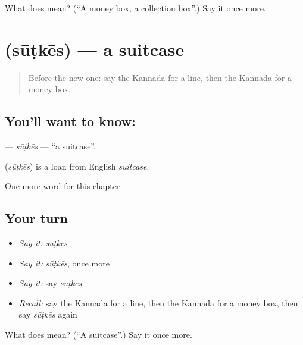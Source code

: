 \begin{tcolorbox}[breakable,colback=teal!4,colframe=teal!35!black,title={Before you move on}]
What does  mean? (\textquotedblleft{}A money box, a collection box\textquotedblright{}.) Say it once more.
\end{tcolorbox}
\section[\texorpdfstring{\kn{ಸೂಟ್ಕೇಸ್} (sūṭkēs)}{ಸೂಟ್ಕೇಸ್ (sūṭkēs)}]{ (sūṭkēs) — a suitcase}

\label{lesson:KA-C230-sutkes}



\begin{quote}
Before the new one: say the Kannada for a line, then the Kannada for a money box.
\end{quote}

\subsection*{You'll want to know: }
\textbf{} — \emph{sūṭkēs} — \textquotedblleft{}a suitcase\textquotedblright{}.

\begin{cousinweb}
\textbf{} (\emph{sūṭkēs}) is a loan from English \emph{suitcase}.
\end{cousinweb}

\begin{grammarlens}[title={What you've built}]
One more word for this chapter.
\end{grammarlens}

\subsection*{Your turn}
\begin{itemize}
\raggedright
  \item \emph{Say it:} \emph{sūṭkēs}
  \item \emph{Say it:} \emph{sūṭkēs}, once more
  \item \emph{Say it:} say \emph{sūṭkēs}
  \item \emph{Recall:} say the Kannada for a line, then the Kannada for a money box, then say \emph{sūṭkēs} again
\end{itemize}

\begin{tcolorbox}[breakable,colback=teal!4,colframe=teal!35!black,title={Before you move on}]
What does  mean? (\textquotedblleft{}A suitcase\textquotedblright{}.) Say it once more.
\end{tcolorbox}

